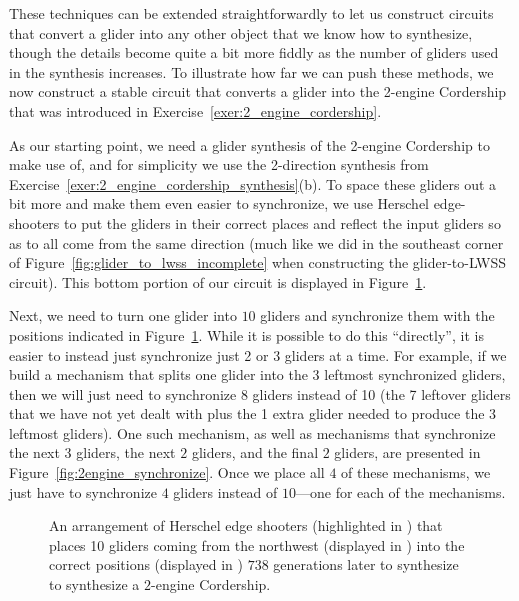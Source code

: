 These techniques can be extended straightforwardly to let us construct circuits that convert a glider into any other object that we know how to synthesize, though the details become quite a bit more fiddly as the number of gliders used in the synthesis increases. To illustrate how far we can push these methods, we now construct a stable circuit that converts a glider into the 2-engine Cordership that was introduced in Exercise~\ref{exer:2_engine_cordership}.

As our starting point, we need a glider synthesis of the 2-engine Cordership to make use of, and for simplicity we use the 2-direction synthesis from Exercise~\ref{exer:2_engine_cordership_synthesis}(b). To space these gliders out a bit more and make them even easier to synchronize, we use Herschel edge-shooters to put the gliders in their correct places and reflect the input gliders so as to all come from the same direction (much like we did in the southeast corner of Figure~\ref{fig:glider_to_lwss_incomplete} when constructing the glider-to-LWSS circuit). This bottom portion of our circuit is displayed in Figure~\ref{fig:g_to_2engine_V}.

Next, we need to turn one glider into $10$ gliders and synchronize them with the positions indicated in Figure~\ref{fig:g_to_2engine_V}. While it is possible to do this ``directly'', it is easier to instead just synchronize just 2 or 3 gliders at a time. For example, if we build a mechanism that splits one glider into the 3 leftmost synchronized gliders, then we will just need to synchronize 8 gliders instead of 10 (the 7 leftover gliders that we have not yet dealt with plus the 1 extra glider needed to produce the 3 leftmost gliders). One such mechanism, as well as mechanisms that synchronize the next $3$ gliders, the next $2$ gliders, and the final $2$ gliders, are presented in Figure~\ref{fig:2engine_synchronize}. Once we place all $4$ of these mechanisms, we just have to synchronize $4$ gliders instead of $10$---one for each of the mechanisms.

\begin{figure}[!htb]
	\centering
	\caption{An arrangement of Herschel edge shooters (highlighted in ) that places 10 gliders coming from the northwest (displayed in ) into the correct positions (displayed in ) $738$ generations later to synthesize to synthesize a $2$-engine Cordership.}\label{fig:g_to_2engine_V}
\end{figure}


